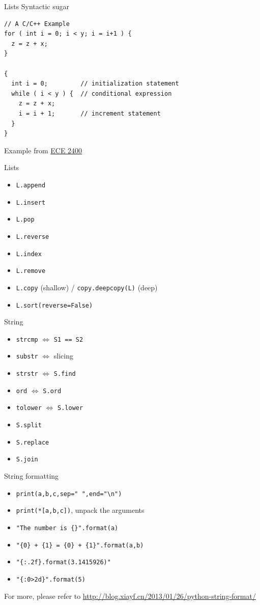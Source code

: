 \documentclass{../TexTemplate/myslide}
\begin{document}
\begin{frame}[fragile]{Lists}
Syntactic sugar
\begin{lstlisting}
// A C/C++ Example
for ( int i = 0; i < y; i = i+1 ) {
  z = z + x;
}

{
  int i = 0;         // initialization statement
  while ( i < y ) {  // conditional expression
    z = z + x;
    i = i + 1;       // increment statement
  }
}
\end{lstlisting}
\scriptsize * Example from \href{https://cornell-ece2400.github.io/ece2400-docs/ece2400-T01-intro-c/#7-syntactic-sugar}{ECE 2400}
\end{frame}

\begin{frame}[fragile]{Lists}
\begin{itemize}
	\item \verb'L.append'
	\item \verb'L.insert'
	\item \verb'L.pop'
	\item \verb'L.reverse'
	\item \verb'L.index'
	\item \verb'L.remove'
	\item \verb'L.copy' (shallow) / \verb'copy.deepcopy(L)' (deep)
	\item \verb'L.sort(reverse=False)'
\end{itemize}
\end{frame}

\begin{frame}[fragile]{String}
\begin{itemize}
	\item \verb'strcmp' $\iff$ \verb'S1 == S2'
	\item \verb'substr' $\iff$ slicing
	\item \verb'strstr' $\iff$ \verb'S.find'
	\item \verb'ord' $\iff$ \verb'S.ord'
	\item \verb'tolower' $\iff$ \verb'S.lower'
	\item \verb'S.split'
	\item \verb'S.replace'
	\item \verb'S.join'
\end{itemize}
\end{frame}

\begin{frame}[fragile]{String formatting}
\begin{itemize}
	\item \verb'print(a,b,c,sep=" ",end="\n")'
	\item \verb'print(*[a,b,c])', unpack the arguments
	\item \verb;"The number is {}".format(a);
	\item \verb;"{0} + {1} = {0} + {1}".format(a,b);
	\item \verb;"{:.2f}.format(3.1415926)";
	\item \verb;"{:0>2d}".format(5);
\end{itemize}
For more, please refer to \url{http://blog.xiayf.cn/2013/01/26/python-string-format/}
\end{frame}
\end{document}
